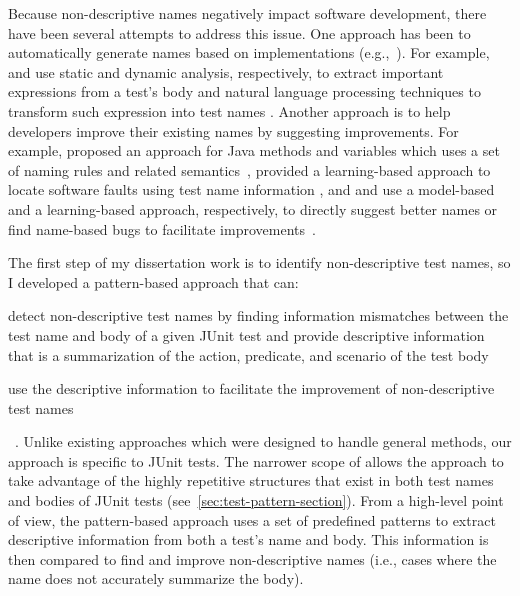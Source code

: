 Because non-descriptive names negatively impact software development, there have been several attempts to address this issue.
%
One approach has been to automatically generate names based on implementations (e.g.,~\cite{arcuri2014automated, zhang2015automatically, daka2017generating}).
%
For example, \citeauthor{zhang2015automatically} and \citeauthor{daka2017generating} use static and dynamic analysis, respectively, to extract important expressions from a test's body and natural language processing techniques to transform such expression into test names \cite{zhang2015automatically, daka2017generating}. 
%
Another approach is to help developers improve their existing names by suggesting improvements.
%
For example, \citeauthor{host2009debugging} proposed an approach for Java methods and variables which uses a set of naming rules and related semantics~\cite{host2009debugging}, \citeauthor{li2019deepfl} provided a learning-based approach to locate software faults using test name information \cite{li2019deepfl}, and \citeauthor{allamanis2015suggesting} and \citeauthor{pradel2018deepbugs} use a model-based and a learning-based approach, respectively, to directly suggest better names or find name-based bugs to facilitate improvements~\cite{allamanis2015suggesting, pradel2018deepbugs}.


The first step of my dissertation work is to identify non-descriptive test names, so I developed a pattern-based approach that can:
\begin{enumerate*}
\item detect non-descriptive test names by finding information mismatches between the test name and body of a given JUnit test and provide descriptive information that is a summarization of the action, predicate, and scenario of the test body
\item use the descriptive information to facilitate the improvement of non-descriptive test names
\end{enumerate*}~\cite{wu2020pattern}.
%
Unlike existing approaches which were designed to handle general methods, our approach is specific to JUnit tests.
%
The narrower scope of allows the approach to take advantage of the highly repetitive structures that exist in both test names and bodies of JUnit tests (see~\cref{sec:test-pattern-section}).
%
From a high-level point of view, the pattern-based approach uses a set of predefined patterns to extract descriptive information from both a test's name and body.
%
This information is then compared to find and improve non-descriptive names (i.e., cases where the name does not accurately summarize the body).



